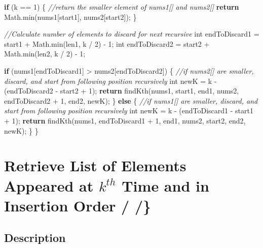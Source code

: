 \documentclass[]{book}
\newenvironment{Shaded}{\begin{snugshade}}{\end{snugshade}}
\newcommand{\BuiltInTok}[1]{#1}
\newcommand{\CommentTok}[1]{\textcolor[rgb]{0.56,0.35,0.01}{\textit{#1}}}
\newcommand{\DataTypeTok}[1]{\textcolor[rgb]{0.13,0.29,0.53}{#1}}
\newcommand{\DecValTok}[1]{\textcolor[rgb]{0.00,0.00,0.81}{#1}}
\newcommand{\FunctionTok}[1]{\textcolor[rgb]{0.00,0.00,0.00}{#1}}
\newcommand{\KeywordTok}[1]{\textcolor[rgb]{0.13,0.29,0.53}{\textbf{#1}}}
\newcommand{\NormalTok}[1]{#1}
\begin{document}
\begin{Shaded}
\begin{Highlighting}[]
    \KeywordTok{if}\NormalTok{ (k == }\DecValTok{1}\NormalTok{) \{}
        \CommentTok{//return the smaller element of nums1[] and nums2[]}
        \KeywordTok{return} \BuiltInTok{Math}\NormalTok{.}\FunctionTok{min}\NormalTok{(nums1[start1], nums2[start2]);}
\NormalTok{    \}}

    \CommentTok{//Calculate number of elements to discard for next recursive}
    \DataTypeTok{int}\NormalTok{ endToDiscard1 = start1 + }\BuiltInTok{Math}\NormalTok{.}\FunctionTok{min}\NormalTok{(len1, k / }\DecValTok{2}\NormalTok{) - }\DecValTok{1}\NormalTok{;}
    \DataTypeTok{int}\NormalTok{ endToDiscard2 = start2 + }\BuiltInTok{Math}\NormalTok{.}\FunctionTok{min}\NormalTok{(len2, k / }\DecValTok{2}\NormalTok{) - }\DecValTok{1}\NormalTok{;}

    \KeywordTok{if}\NormalTok{ (nums1[endToDiscard1] > nums2[endToDiscard2]) \{}
        \CommentTok{//if nums2[] are smaller, discard, and start from following position recursively}
        \DataTypeTok{int}\NormalTok{ newK = k - (endToDiscard2 - start2 + }\DecValTok{1}\NormalTok{);}
        \KeywordTok{return} \FunctionTok{findKth}\NormalTok{(nums1, start1, end1, nums2, endToDiscard2 + }\DecValTok{1}\NormalTok{, end2, newK);}
\NormalTok{    \} }\KeywordTok{else}\NormalTok{ \{}
        \CommentTok{//if nums1[] are smaller, discard, and start from following position recursively}
        \DataTypeTok{int}\NormalTok{ newK = k - (endToDiscard1 - start1 + }\DecValTok{1}\NormalTok{);}
        \KeywordTok{return} \FunctionTok{findKth}\NormalTok{(nums1, endToDiscard1 + }\DecValTok{1}\NormalTok{, end1, nums2, start2, end2, newK);}
\NormalTok{    \}}
\NormalTok{\}}
\end{Highlighting}
\end{Shaded}

\hypertarget{retrieve-list-of-elements-appeared-at-kth-time-and-in-insertion-order}{%
\section{\texorpdfstring{Retrieve List of Elements Appeared at \(k^{th}\) Time and in Insertion Order / /\}}{Retrieve List of Elements Appeared at k\^{}\{th\} Time and in Insertion Order / /\}}}\label{retrieve-list-of-elements-appeared-at-kth-time-and-in-insertion-order}}

\hypertarget{description-13}{%
\subsection{Description}\label{description-13}}
\end{document}
